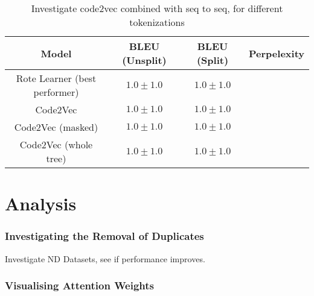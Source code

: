 \begin{table}[h!]
\begin{center}
\begin{tabular}{ c | c | c | c }
    Model                             & BLEU (Unsplit)  & BLEU (Split)    & Perpelexity \\
    \hline
    Rote Learner (best performer)           & $1.0 \pm 1.0 $  & $1.0 \pm 1.0 $  & \\
    \hline
    Code2Vec                             & $1.0 \pm 1.0 $  & $1.0 \pm 1.0 $  &  \\
    Code2Vec (masked)                    & $1.0 \pm 1.0 $  & $1.0 \pm 1.0 $  &  \\
    Code2Vec (whole tree)                & $1.0 \pm 1.0 $  & $1.0 \pm 1.0 $  &  \\
    \hline
\end{tabular}
\caption {Investigate code2vec combined with seq to seq, for different tokenizations}
\label{table:name_baseline}
\end{center}
\end{table}


\section{Analysis} %
\label{sec:analysis}


\subsubsection{Investigating the Removal of Duplicates} %
\label{ssub:investigating_the_removal_of_duplicates}

Investigate ND Datasets, see if performance improves.

\subsubsection{Visualising Attention Weights} %
\label{ssub:visualising_attention_weights}

